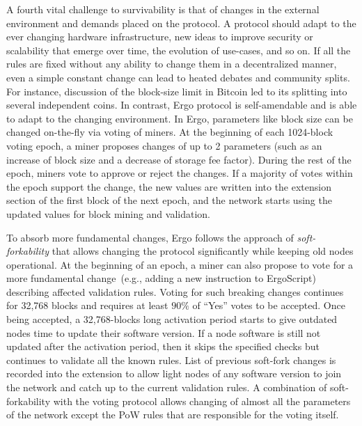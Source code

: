 A fourth vital challenge to survivability is that of changes in the external environment and demands placed on the protocol.
A protocol should adapt to the ever changing hardware infrastructure, new ideas to improve security or
scalability that emerge over time, the evolution of use-cases, and so on.
If all the rules are fixed without any ability to change them in a decentralized manner, even
a simple constant change can lead to heated debates and community splits. For instance,  discussion of the block-size limit in Bitcoin led to its splitting into several independent coins.
In contrast, Ergo protocol is self-amendable and is able to adapt to the changing environment.
In Ergo, parameters like block size can be changed on-the-fly via voting of miners.
At the beginning of each 1024-block voting epoch, a miner proposes changes of up to 2 parameters (such as an increase of block size and a decrease of storage fee factor). During the rest of the epoch, miners vote to approve or reject the changes.
If a majority of votes within the epoch support the change, the new values are written into the extension section of the first block of the next epoch, and
the network starts using the updated values for block mining and validation.

To absorb more fundamental changes, Ergo follows the approach of {\em soft-forkability} that
allows changing the protocol significantly while keeping old nodes operational.
At the beginning of an epoch, a miner can also propose to vote for a more fundamental change~(e.g., adding a new instruction to ErgoScript) describing affected validation rules.
Voting for such breaking changes continues for 32,768 blocks and requires at least $90\%$ of
``Yes'' votes to be accepted. Once being accepted, a 32,768-blocks long activation period starts to give outdated nodes time to update their software version.
If a node software is still not updated after the activation period, then it skips the specified checks but continues to validate all the known rules.
List of previous soft-fork changes is recorded into the extension to allow light nodes of
any software version to join the network and catch up to the current validation rules.
A combination of soft-forkability with the voting protocol allows changing of almost all the parameters of the network except the PoW rules that are responsible for the voting itself.
